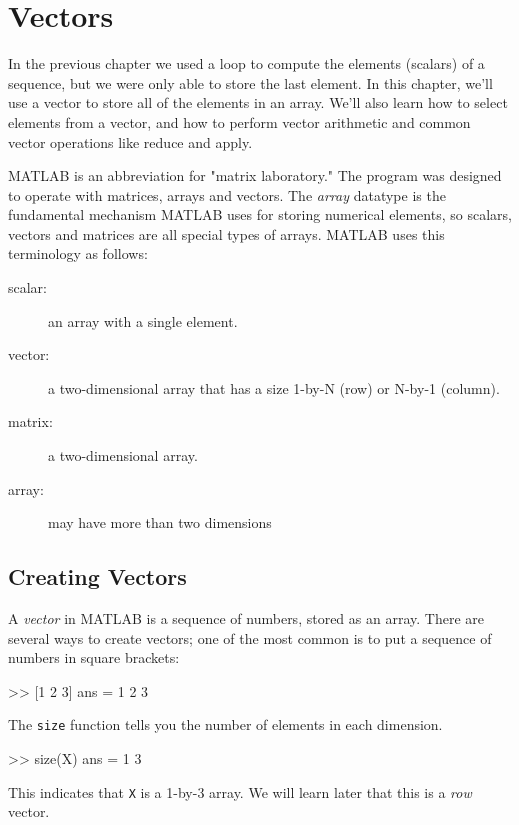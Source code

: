 \chapter{Vectors}
\label{vectors}


In the previous chapter we used a loop to compute the elements (scalars) of a sequence, but we were only able to store the last element.  In this chapter, we'll use a vector to store all of the elements in an array.
We'll also learn how to select elements from a vector, and how to perform vector arithmetic and common vector operations like reduce and apply.

MATLAB is an abbreviation for "matrix laboratory."  The program was designed to operate with matrices, arrays and vectors.  The \emph{array} datatype is the fundamental mechanism MATLAB uses for storing numerical elements, so scalars, vectors and matrices are all special types of arrays.  MATLAB uses this terminology as follows:

\begin{description}
\item[scalar:] an array with a single element.
\item[vector:] a two-dimensional array that has a size 1-by-N (row) or N-by-1 (column).
\item[matrix:] a two-dimensional array.
\item[array:] may have more than two dimensions
\end{description}



\section{Creating Vectors}


A \emph{vector} in MATLAB is a sequence of numbers, stored as an array.
There are several ways to create vectors; one of the most common is
to put a sequence of numbers in square brackets:

\begin{code}
>> [1 2 3]
ans = 1     2     3
\end{code}

The \lstinline{size} function tells you the number of elements in each dimension.

\begin{code}
>> size(X)
ans =
    1     3
\end{code}
This indicates that \lstinline{X} is a 1-by-3 array.  We will learn later that this is a \emph{row} vector.


